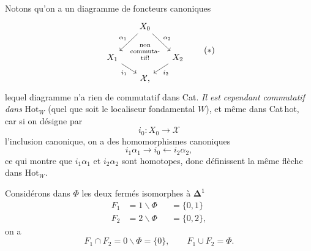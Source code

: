 \documentclass[11pt]{article}
\newcommand{\msp}[1]{\marginpar{\footnotesize [#1]}}
\newcommand{\Hot}{\mathrm{Hot}}
\newcommand{\cX}{\mathcal{X}}
\begin{document}
Notons qu'on a un diagramme de foncteurs canoniques
\[
\begin{tikzcd}[column sep=tiny, row sep=small, ampersand replacement=\&]
 \& X_0 \arrow[dl, "\alpha_1"'] \arrow[dr, "\alpha_2"] \& \\
X_1 \arrow[dr, "i_1"'] \& {\shortstack{\scriptsize non\\ \scriptsize commuta-\\ \scriptsize tif!}} \& X_2 \arrow[dl, "i_2"] \\
 \& \cX, \&
\end{tikzcd}
\tag*{$(*)$}
\]
lequel diagramme n'a rien de commutatif dans Cat. \textit{Il est cependant commutatif dans} $\Hot_W$ (quel que soit le localiseur fondamental $W$), et même dans Cat\,hot, car si on désigne par
\[
i_0 : X_0 \longrightarrow \cX
\]
l'inclusion canonique, on a des homomorphismes canoniques
\[
i_1\alpha_1 \longrightarrow i_0 \longleftarrow i_2\alpha_2,
\]
ce qui montre que $i_1\alpha_1$ et $i_2\alpha_2$ sont homotopes, donc définissent la même flèche dans $\Hot_W$.

\msp{page 124}
Considérons dans $\Phi$ les deux fermés isomorphes à $\boldsymbol{\Delta}^1$
\[
\begin{aligned}
F_1 &= 1\backslash\Phi &&= \{0,1\}\\
F_2 &= 2\backslash\Phi &&= \{0,2\},
\end{aligned}
\]
on a
\[
F_1\cap F_2 = 0\backslash\Phi = \{0\}, \qquad F_1\cup F_2 = \Phi.
\]
\end{document}
